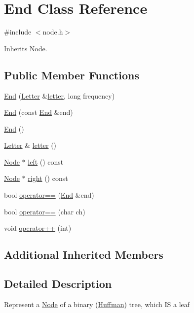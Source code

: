 \hypertarget{class_end}{}\section{End Class Reference}
\label{class_end}


{\ttfamily \#include $<$node.\+h$>$}



Inherits \hyperlink{class_node}{Node}.

\subsection*{Public Member Functions}
\begin{DoxyCompactItemize}
\item 
\hyperlink{class_end_aec010332b2484030781dff4ab47156ce}{End} (\hyperlink{class_letter}{Letter} \&\hyperlink{class_end_a8528f92e9da9ac41a938c559b50eb174}{letter}, long frequency)
\item 
\hyperlink{class_end_a9cdb20f0a78b188e13de7c4afc1a0bf4}{End} (const \hyperlink{class_end}{End} \&end)
\item 
\hyperlink{class_end_acd25fa8f481c50f5b8eaff4af1159942}{End} ()
\item 
\hyperlink{class_letter}{Letter} \& \hyperlink{class_end_a8528f92e9da9ac41a938c559b50eb174}{letter} ()
\item 
\hyperlink{class_node}{Node} $\ast$ \hyperlink{class_end_a812df7f23fffdb2274ca2003ebd8e884}{left} () const
\item 
\hyperlink{class_node}{Node} $\ast$ \hyperlink{class_end_ac8e651d50ce2b99256be11aa9b89ded4}{right} () const
\item 
bool \hyperlink{class_end_a0be5ea8a94107bb8c3a0a2eb19d8188c}{operator==} (\hyperlink{class_end}{End} \&end)
\item 
bool \hyperlink{class_end_a0b3d32d1f08031447f6facf17ee17dff}{operator==} (char ch)
\item 
void \hyperlink{class_end_aa1acae6e027fc01427b07afe58f44f09}{operator++} (int)
\end{DoxyCompactItemize}
\subsection*{Additional Inherited Members}


\subsection{Detailed Description}
Represent a \hyperlink{class_node}{Node} of a binary (\hyperlink{class_huffman}{Huffman}) tree, which IS a leaf 

